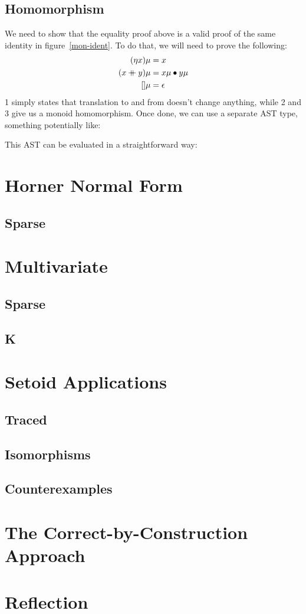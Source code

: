 \documentclass[draft, twocolumn]{article}
\newcommand\mdoubleplus{\ensuremath{\mathbin{+\mkern-10mu+}}}
\begin{document}
\subsection{Homomorphism}
We need to show that the equality proof above is a valid proof of the same
identity in figure~\ref{mon-ident}. To do that, we will need to prove the
following:
\begin{align}
  (\eta x) \mu           &= x \\
  (x \mdoubleplus y) \mu &= x \mu \bullet y \mu \\
  [] \mu                 &= \epsilon
\end{align}
1 simply states that translation to and from doesn't change anything, while 2
and 3 give us a monoid homomorphism. Once done, we can use a separate AST type,
something potentially like:

This AST can be evaluated in a straightforward way:

\section{Horner Normal Form}
\subsection{Sparse}
\section{Multivariate}
\subsection{Sparse}
\subsection{K}
\section{Setoid Applications}
\subsection{Traced}
\subsection{Isomorphisms}
\subsection{Counterexamples}
\section{The Correct-by-Construction Approach}
\section{Reflection}


\end{document}

